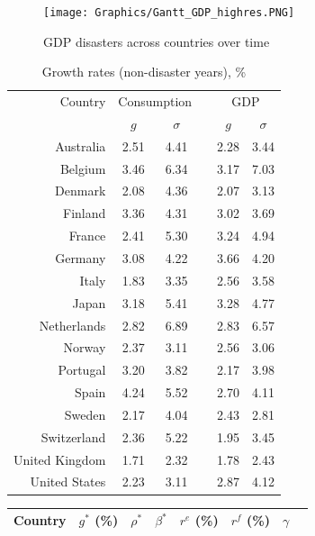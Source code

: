 {{{{{\begin{figure}[H]
	\centering
  \texttt{[image: Graphics/Gantt\_GDP\_highres.PNG]}
	\caption{GDP disasters across countries over time}
	\label{fig:Gant_GDP}
\end{figure}

{\renewcommand{\arraystretch}{1.0}
\begin{table}[H]
\begin{center}
\begin{tabular}{rccccc}
\hline
\hline
Country & \multicolumn{2}{c}{Consumption} & & \multicolumn{2}{c}{GDP} \\
\cline{2-3} \cline{5-6} 
 & $g$ & $\sigma$ & & $g$ & $\sigma$\\
\hline
Australia & 2.51 & 4.41 &  & 2.28 & 3.44\\
Belgium & 3.46 & 6.34 &  & 3.17 & 7.03\\
Denmark & 2.08 & 4.36 &  & 2.07 & 3.13\\ 
Finland & 3.36 & 4.31 &  & 3.02 & 3.69\\ 
France & 2.41 & 5.30 &  & 3.24 & 4.94\\ 
Germany & 3.08 & 4.22 &  & 3.66 & 4.20\\
Italy & 1.83 & 3.35 &  & 2.56 & 3.58\\
Japan & 3.18 & 5.41 &  & 3.28 & 4.77\\
Netherlands & 2.82 & 6.89 &  & 2.83 & 6.57\\
Norway & 2.37 & 3.11 &  & 2.56 & 3.06\\ 
Portugal & 3.20 & 3.82 &  & 2.17 & 3.98\\
Spain & 4.24 & 5.52 &  & 2.70 & 4.11\\
Sweden & 2.17 & 4.04 &  & 2.43 & 2.81\\
Switzerland & 2.36 & 5.22 &  & 1.95 & 3.45\\
United Kingdom & 1.71 & 2.32 &  & 1.78 & 2.43\\
United States & 2.23 & 3.11 &  & 2.87 & 4.12\\
\hline
\hline
\end{tabular} 
\end{center}
\caption{Growth rates (non-disaster years), \%}
\label{tab:growth_non_disaster}
\end{table}

{\renewcommand{\arraystretch}{1.0}
\begin{table}[H]
\begin{center}
\begin{tabular}{rccccccc}
\hline
\hline
Country & $g^{*}$ (\%) & $\rho^{*}$ & $\beta^{*}$ & $r^{e}$ (\%) & $r^{f}$ (\%) & \underline{$\gamma$} & \boldsymbol{$\gamma$}\\
\hline


\end{tabular}
\end{center}
\end{table}}}}}}}}
